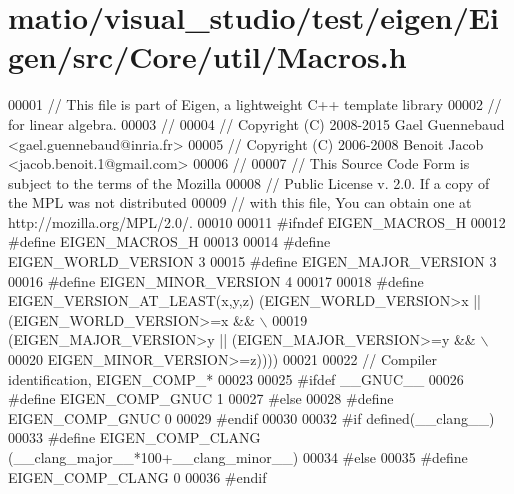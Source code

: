 \hypertarget{matio_2visual__studio_2test_2eigen_2_eigen_2src_2_core_2util_2_macros_8h_source}{}\section{matio/visual\+\_\+studio/test/eigen/\+Eigen/src/\+Core/util/\+Macros.h}
\label{matio_2visual__studio_2test_2eigen_2_eigen_2src_2_core_2util_2_macros_8h_source}

\begin{DoxyCode}
00001 \textcolor{comment}{// This file is part of Eigen, a lightweight C++ template library}
00002 \textcolor{comment}{// for linear algebra.}
00003 \textcolor{comment}{//}
00004 \textcolor{comment}{// Copyright (C) 2008-2015 Gael Guennebaud <gael.guennebaud@inria.fr>}
00005 \textcolor{comment}{// Copyright (C) 2006-2008 Benoit Jacob <jacob.benoit.1@gmail.com>}
00006 \textcolor{comment}{//}
00007 \textcolor{comment}{// This Source Code Form is subject to the terms of the Mozilla}
00008 \textcolor{comment}{// Public License v. 2.0. If a copy of the MPL was not distributed}
00009 \textcolor{comment}{// with this file, You can obtain one at http://mozilla.org/MPL/2.0/.}
00010 
00011 \textcolor{preprocessor}{#ifndef EIGEN\_MACROS\_H}
00012 \textcolor{preprocessor}{#define EIGEN\_MACROS\_H}
00013 
00014 \textcolor{preprocessor}{#define EIGEN\_WORLD\_VERSION 3}
00015 \textcolor{preprocessor}{#define EIGEN\_MAJOR\_VERSION 3}
00016 \textcolor{preprocessor}{#define EIGEN\_MINOR\_VERSION 4}
00017 
00018 \textcolor{preprocessor}{#define EIGEN\_VERSION\_AT\_LEAST(x,y,z) (EIGEN\_WORLD\_VERSION>x || (EIGEN\_WORLD\_VERSION>=x && \(\backslash\)}
00019 \textcolor{preprocessor}{                                      (EIGEN\_MAJOR\_VERSION>y || (EIGEN\_MAJOR\_VERSION>=y && \(\backslash\)}
00020 \textcolor{preprocessor}{                                                                 EIGEN\_MINOR\_VERSION>=z))))}
00021 
00022 \textcolor{comment}{// Compiler identification, EIGEN\_COMP\_*}
00023 
00025 \textcolor{preprocessor}{#ifdef \_\_GNUC\_\_}
00026 \textcolor{preprocessor}{  #define EIGEN\_COMP\_GNUC 1}
00027 \textcolor{preprocessor}{#else}
00028 \textcolor{preprocessor}{  #define EIGEN\_COMP\_GNUC 0}
00029 \textcolor{preprocessor}{#endif}
00030 
00032 \textcolor{preprocessor}{#if defined(\_\_clang\_\_)}
00033 \textcolor{preprocessor}{  #define EIGEN\_COMP\_CLANG (\_\_clang\_major\_\_*100+\_\_clang\_minor\_\_)}
00034 \textcolor{preprocessor}{#else}
00035 \textcolor{preprocessor}{  #define EIGEN\_COMP\_CLANG 0}
00036 \textcolor{preprocessor}{#endif}

\end{DoxyCode}
